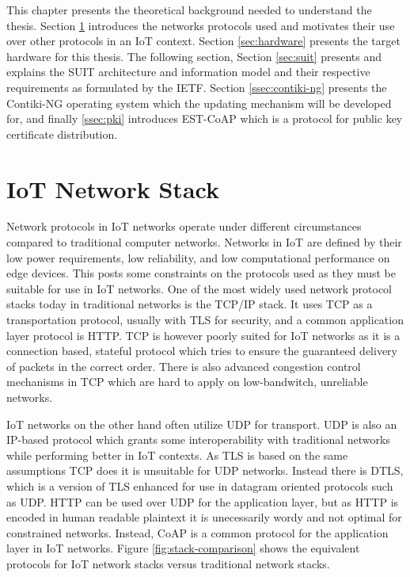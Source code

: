 \documentclass[0-thesis.tex]{subfiles}
\begin{document}
This chapter presents the theoretical background needed to understand the thesis. Section
\ref{sec:network} introduces the networks protocols used and motivates their use over
other protocols in an IoT context. Section \ref{sec:hardware} presents the target hardware
for this thesis. The following section, Section \ref{sec:suit} presents and explains the
SUIT architecture and information model and their respective requirements as formulated by
the IETF. Section \ref{ssec:contiki-ng} presents the Contiki-NG operating system which the
updating mechanism will be developed for, and finally \ref{ssec:pki} introduces EST-CoAP
which is a protocol for public key certificate distribution. 

\section{IoT Network Stack}
\label{sec:network}
Network protocols in IoT networks operate under different circumstances compared to
traditional computer networks. Networks in IoT are defined by their low power
requirements, low reliability, and low computational performance on edge devices. This
posts some constraints on the protocols used as they must be suitable for use in IoT
networks. One of the most widely used network protocol stacks today in traditional
networks is the TCP/IP stack. It uses TCP as a transportation protocol, usually with TLS
for security, and a common application layer protocol is HTTP. TCP is however poorly
suited for IoT networks as it is a connection based, stateful protocol which tries to
ensure the guaranteed delivery of packets in the correct order. There is also advanced
congestion control mechanisms in TCP which are hard to apply on low-bandwitch, unreliable
networks.

IoT networks on the other hand often utilize UDP for transport. UDP is also an IP-based
protocol which grants some interoperability with traditional networks while performing
better in IoT contexts. As TLS is based on the same assumptions TCP does it is unsuitable
for UDP networks. Instead there is DTLS, which is a version of TLS enhanced for use in
datagram oriented protocols such as UDP. HTTP can be used over UDP for the application
layer, but as HTTP is encoded in human readable plaintext it is unecessarily wordy and not
optimal for constrained networks. Instead, CoAP is a common protocol for the application
layer in IoT networks. Figure \ref{fig:stack-comparison} shows the equivalent protocols
for IoT network stacks versus traditional network stacks. 
\end{document}
